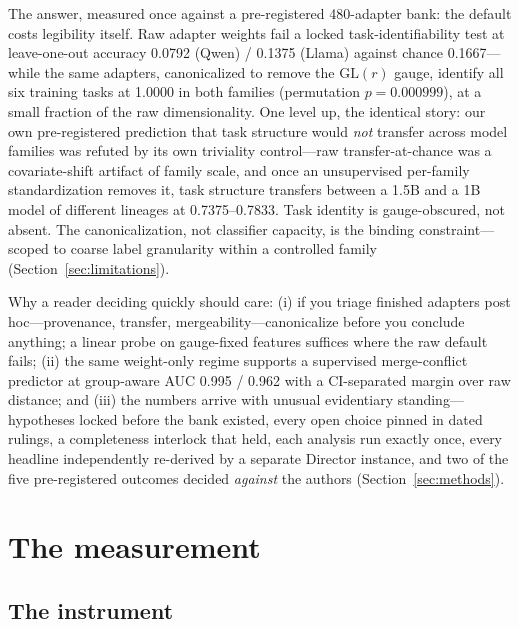 \documentclass[10pt]{article}
\begin{document}
The answer, measured once against a pre-registered 480-adapter bank: the
default costs legibility itself. Raw adapter weights fail a locked
task-identifiability test at leave-one-out accuracy 0.0792 (Qwen) / 0.1375
(Llama) against chance 0.1667---while the same adapters, canonicalized to
remove the $\mathrm{GL}(r)$ gauge, identify all six training tasks at
1.0000 in both families (permutation $p = 0.000999$), at a small fraction
of the raw dimensionality. One level up, the identical story: our own
pre-registered prediction that task structure would \emph{not} transfer
across model families was refuted by its own triviality control---raw
transfer-at-chance was a covariate-shift artifact of family scale, and once
an unsupervised per-family standardization removes it, task structure
transfers between a 1.5B and a 1B model of different lineages at
0.7375--0.7833. Task identity is gauge-obscured, not absent. The
canonicalization, not classifier capacity, is the binding
constraint---scoped to coarse label granularity within a controlled family
(Section~\ref{sec:limitations}).

Why a reader deciding quickly should care: (i) if you triage finished
adapters post hoc---provenance, transfer, mergeability---canonicalize
before you conclude anything; a linear probe on gauge-fixed features
suffices where the raw default fails; (ii) the same weight-only regime
supports a supervised merge-conflict predictor at group-aware AUC 0.995 /
0.962 with a CI-separated margin over raw distance; and (iii) the numbers
arrive with unusual evidentiary standing---hypotheses locked before the
bank existed, every open choice pinned in dated rulings, a completeness
interlock that held, each analysis run exactly once, every headline
independently re-derived by a separate Director instance, and two of the
five pre-registered outcomes decided \emph{against} the authors
(Section~\ref{sec:methods}).

\section{The measurement}
\label{sec:measurement}

\subsection{The instrument}
\label{sec:instrument}
\end{document}
